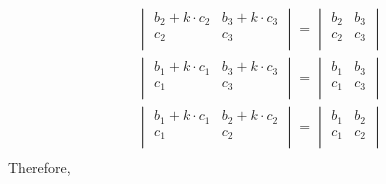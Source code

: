 \documentclass{article}
\begin{document}
\begin{gather*}
  \begin{vmatrix}
    b_2 + k \cdot c_2 & b_3 + k \cdot c_3 \\
    c_2 & c_3 \\ 
  \end{vmatrix} = 
  \begin{vmatrix}
    b_2 & b_3 \\
    c_2 & c_3 \\ 
  \end{vmatrix} \\
  \begin{vmatrix}
    b_1 + k \cdot c_1 & b_3 + k \cdot c_3 \\
    c_1 & c_3 \\ 
  \end{vmatrix} = 
  \begin{vmatrix}
    b_1 & b_3 \\
    c_1 & c_3 \\ 
  \end{vmatrix} \\
  \begin{vmatrix}
    b_1 + k \cdot c_1 & b_2 + k \cdot c_2 \\
    c_1 & c_2 \\ 
  \end{vmatrix} = 
  \begin{vmatrix}
    b_1 & b_2 \\
    c_1 & c_2 \\ 
  \end{vmatrix} \\
\end{gather*}
Therefore,
\end{document}
